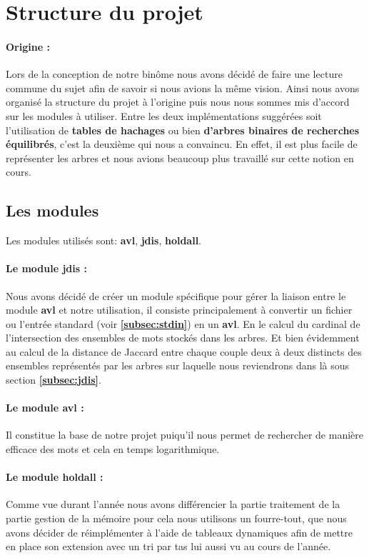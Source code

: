 \documentclass{article}
\begin{document}
\section{Structure du projet}

\paragraph{Origine :}
Lors de la conception de notre binôme nous avons décidé de faire une lecture commune du sujet
afin de savoir si nous avions la même vision. Ainsi nous avons organisé la structure du projet
à l'origine puis nous nous sommes mis d'accord sur les modules à utiliser. Entre les deux
implémentations suggérées soit l'utilisation de \textbf{tables de hachages} ou bien \textbf{d'arbres binaires
de recherches équilibrés}, c'est la deuxième qui nous a convaincu. En effet, il est plus
facile de représenter les arbres et nous avions beaucoup plus travaillé sur cette notion en cours.

\subsection{Les modules}
Les modules utilisés sont: \textbf{avl}, \textbf{jdis}, \textbf{holdall}.

\paragraph{Le module jdis :}
Nous avons décidé de créer un module spécifique pour gérer la liaison entre le module \textbf{avl}
et notre utilisation, il consiste principalement à convertir un fichier ou l'entrée standard (voir \textbf{\ref{subsec:stdin}})
en un \textbf{avl}. En le calcul du cardinal de l'intersection des ensembles de mots stockés dans les
arbres. Et bien évidemment au calcul de la distance de Jaccard entre chaque couple deux à deux distincts
des ensembles représentés par les arbres sur laquelle nous reviendrons dans là sous section \textbf{\ref{subsec:jdis}}.

\paragraph{Le module avl :}
Il constitue la base de notre projet puiqu'il nous permet de rechercher de manière efficace des mots et 
cela en temps logarithmique.

\paragraph{Le module holdall :}
Comme vue durant l'année nous avons différencier la partie traitement de la partie gestion de la mémoire
pour cela nous utilisons un fourre-tout, que nous avons décider de réimplémenter à l'aide de tableaux dynamiques
afin de mettre en place son extension avec un tri par tas lui aussi vu au cours de l'année.
\end{document}

